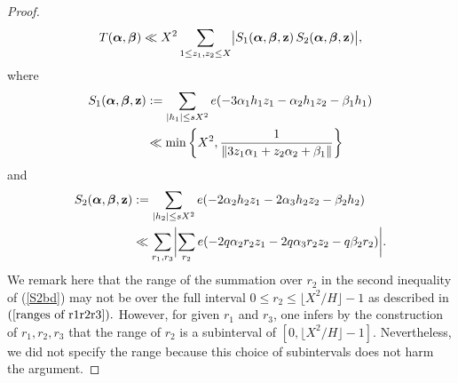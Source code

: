 \documentclass{amsart}%
\numberwithin{equation}{section}
\theoremstyle{remark}
\newcommand{\bz}{{\bf z}}
\newcommand{\1}{\mathbbm{1}}
\newcommand{\balp}{\boldsymbol{\alpha}}
\newcommand{\bbet}{\boldsymbol{\beta}}
\begin{document}
\begin{proof}
\begin{equation}
    T(\balp, \bbet) \ll X^2 \sum_{1\leq z_1,z_2\leq X} \bigl| S_1(\balp, \bbet, \bz) \, S_2(\balp, \bbet, \bz) \bigr|, 
\end{equation}
where
\begin{equation}\label{S1bd}
\begin{aligned}
S_1(\balp, \bbet, \bz) &:= \sum_{|h_1|\leq sX^{2}}e(-3\alpha_1h_1z_1-\alpha_2h_1z_2-\beta_1h_1) \\
&\ll \min\left\{X^{2},\frac{1}{\|3z_1\alpha_1+z_2\alpha_2+\beta_1\|}\right\}
\end{aligned}
\end{equation}
and
\begin{equation}\label{S2bd}
\begin{aligned}
S_2(\balp, \bbet, \bz) &:= \sum_{|h_2|\leq sX^2}e(-2\alpha_2h_2z_1-2\alpha_3h_2z_2-\beta_2h_2)  \\
&\ll \sum_{r_1,r_3}\biggl|\sum_{r_2}e(-2q\alpha_2r_2z_1-2q\alpha_3r_2z_2-q\beta_2r_2)\biggr|. \end{aligned}
\end{equation}
We remark here that the range of the summation over $r_2$ in the second inequality of (\ref{S2bd}) may not be over the full interval $0\leq r_2\leq \lfloor X^{2}/H\rfloor-1$ as described in $(\ref{ranges of r1r2r3}).$ However, for given $r_1$ and $r_3$, one infers by the construction of $r_1,r_2,r_3$ that the range of $r_2$ is a subinterval of $[0,\lfloor X^{2}/H\rfloor-1]$. Nevertheless, we did not specify the range because this choice of subintervals does not harm the argument.


\end{proof}
\end{document}
